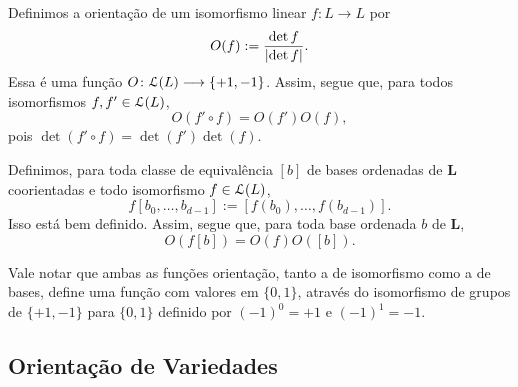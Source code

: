 Definimos a orientação de um isomorfismo linear $f\colon L \to L$ por
	\begin{equation*}
	O(f) := \frac{\det f}{\left\vert{\det f}\right\vert}.
	\end{equation*}
Essa é uma função $O\colon \mathcal{L}(L) \longrightarrow \{+1,-1\}$. Assim, segue que, para todos isomorfismos $f,f' \in \mathcal{L}(L)$,
	\begin{equation*}
	O(f' \circ f) = O(f')O(f),
	\end{equation*}
pois $\det(f' \circ f) = \det(f')\det(f)$.

Definimos, para toda classe de equivalência $[b]$ de bases ordenadas de $\bm L$ coorientadas e todo isomorfismo $f \in \mathcal{L}(L)$,
	\begin{equation*}
	f[b_0, \ldots, b_{d-1}] := [f(b_0), \ldots, f(b_{d-1})].
	\end{equation*}
Isso está bem definido. Assim, segue que, para toda base ordenada $b$ de $\bm L$,
	\begin{equation*}
	O(f[b]) = O(f)O([b]).
	\end{equation*}

Vale notar que ambas as funções orientação, tanto a de isomorfismo como a de bases, define uma função com valores em $\{0,1\}$, através do isomorfismo de grupos de $\{+1,-1\}$ para $\{0,1\}$ definido por $(-1)^0 = +1$ e $(-1)^1 = -1$.

\subsection{Orientação de Variedades}


